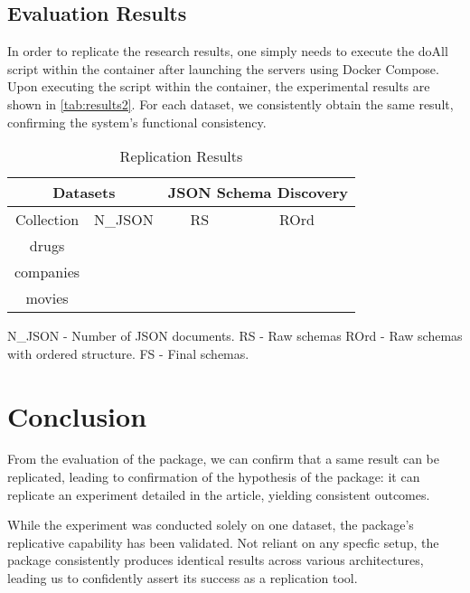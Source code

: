\documentclass[sigconf, nonacm]{acmart}
\begin{document}
\subsection{Evaluation Results}

In order to replicate the research results, one simply needs to execute the doAll script within the container after launching the servers using Docker Compose. Upon executing the script within the container, the experimental results are shown in \autoref{tab:results2}. For each dataset, we consistently obtain the same result, confirming the system’s functional consistency.

\begin{table}[hb]%
	\centering
	\caption{Replication Results}
	\label{tab:results2}
	\begin{tabular}{|c|c|c|c|}
		\hline
		\multicolumn{2}{|c|}{Datasets} & \multicolumn{2}{c|}{JSON Schema Discovery} \\
		\hline
		Collection                     & N\_JSON                                    & RS          & ROrd  \\
		\hline
		drugs                          & \drugsCount                                       & \drugsUnordered        & \drugsOrdered  \\
		\hline
		companies                      & \companiesCount                                      & \companiesUnordered       & \companiesOrdered \\
		\hline
		movies                         & \moviesCount                                      & \moviesUnordered       & \moviesOrdered  \\
		\hline
	\end{tabular}
	\parbox{0.4\textwidth}{
		\raggedright\footnotesize
		N\_JSON - Number of JSON documents. RS - Raw schemas \newline
		ROrd - Raw schemas with ordered structure. FS - Final schemas.
	}
\end{table}

\section{Conclusion}

From the evaluation of the package, we can confirm that a same result can be replicated, leading to confirmation of the hypothesis of the package: it can replicate an experiment detailed in the article, yielding consistent outcomes.

While the experiment was conducted solely on one dataset, the package’s replicative capability has been validated. Not reliant on any specfic setup, the package consistently produces identical results across various architectures, leading us to confidently assert its success as a replication tool.




\end{document}
